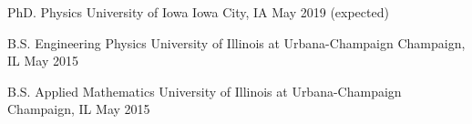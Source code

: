 
\begin{cventries}

    \cventry
    {PhD. Physics} %
    {University of Iowa}
    {Iowa City, IA}
    {May 2019 (expected)}
    {}
    \vspace{-2ex}

  \cventry
    {B.S. Engineering Physics} %
    {University of Illinois at Urbana-Champaign} %
    {Champaign, IL} %
    {May 2015} %
    {}
    \vspace{-2ex}

    \cventry
    {B.S. Applied Mathematics} %
    {University of Illinois at Urbana-Champaign} %
    {Champaign, IL} %
    {May 2015} %
    {}
    \vspace{-2ex}

\end{cventries}
